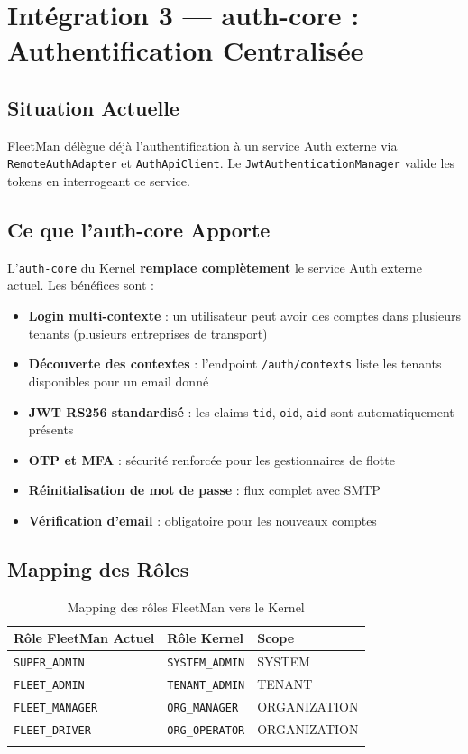 \documentclass[12pt,a4paper]{report}
\begin{document}
\section{Intégration 3 — auth-core : Authentification Centralisée}

\subsection{Situation Actuelle}

FleetMan délègue déjà l'authentification à un service Auth externe via \texttt{RemoteAuthAdapter} et \texttt{AuthApiClient}. Le \texttt{JwtAuthenticationManager} valide les tokens en interrogeant ce service.

\subsection{Ce que l'auth-core Apporte}

L'\texttt{auth-core} du Kernel \textbf{remplace complètement} le service Auth externe actuel. Les bénéfices sont :

\begin{itemize}[leftmargin=2cm]
  \item \textbf{Login multi-contexte} : un utilisateur peut avoir des comptes dans plusieurs tenants (plusieurs entreprises de transport)
  \item \textbf{Découverte des contextes} : l'endpoint \texttt{/auth/contexts} liste les tenants disponibles pour un email donné
  \item \textbf{JWT RS256 standardisé} : les claims \texttt{tid}, \texttt{oid}, \texttt{aid} sont automatiquement présents
  \item \textbf{OTP et MFA} : sécurité renforcée pour les gestionnaires de flotte
  \item \textbf{Réinitialisation de mot de passe} : flux complet avec SMTP
  \item \textbf{Vérification d'email} : obligatoire pour les nouveaux comptes
\end{itemize}

\subsection{Mapping des Rôles}

\begin{longtable}{p{5cm}p{5cm}p{3cm}}
\toprule
\textbf{Rôle FleetMan Actuel} & \textbf{Rôle Kernel} & \textbf{Scope} \\
\midrule
\endhead
\texttt{SUPER\_ADMIN} & \texttt{SYSTEM\_ADMIN} & SYSTEM \\
\texttt{FLEET\_ADMIN} & \texttt{TENANT\_ADMIN} & TENANT \\
\texttt{FLEET\_MANAGER} & \texttt{ORG\_MANAGER} & ORGANIZATION \\
\texttt{FLEET\_DRIVER} & \texttt{ORG\_OPERATOR} & ORGANIZATION \\
\bottomrule
\caption{Mapping des rôles FleetMan vers le Kernel}
\end{longtable}
\end{document}
